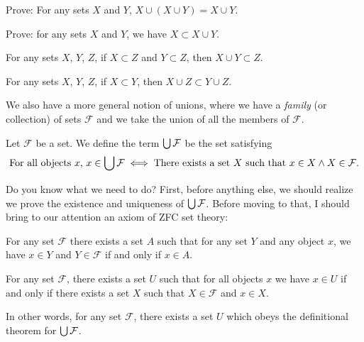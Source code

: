\begin{xca}
Prove: For any sets $X$ and $Y$, $X\cup(X\cup Y)=X\cup Y$.
\end{xca}

\begin{xca}
Prove: for any sets $X$ and $Y$, we have $X\subset X\cup Y$.
\end{xca}

\begin{xca}
For any sets $X$, $Y$, $Z$, if $X\subset Z$ and $Y\subset Z$, then
$X\cup Y\subset Z$.
\end{xca}

\begin{xca}
For any sets $X$, $Y$, $Z$, if $X\subset Y$, then
$X\cup Z\subset Y\cup Z$.
\end{xca}

We also have a more general notion of unions, where we have a
\emph{family} (or collection) of sets $\mathcal{F}$ and we take the
union of all the members of $\mathcal{F}$.

\begin{definition}
Let $\mathcal{F}$ be a set.
We define the term $\bigcup\mathcal{F}$ be the set satisfying
\begin{equation}\label{eq:def:unions:union-of-family}
\mbox{For all objects $x$, }x\in\bigcup\mathcal{F}\iff\mbox{There exists a set $X$ such that }x\in X\land X\in\mathcal{F}.
\end{equation}
\end{definition}

Do you know what we need to do? First, before anything else, we should
realize we prove the existence and uniqueness of
$\bigcup\mathcal{F}$. Before moving to that, I should bring to our
attention an axiom of ZFC set theory:

\begin{axiom}[Union]\label{axiom:existence-of-union}
For any set $\mathcal{F}$ there exists a set $A$ such that for any set
$Y$ and any object $x$, we have $x\in Y$ and $Y\in\mathcal{F}$ if and
only if $x\in A$.
\end{axiom}

\begin{theorem}[Existence]
For any set $\mathcal{F}$, there exists a set $U$ such that for all
objects $x$ we have $x\in U$ if and only if there exists a set $X$ such
that $X\in\mathcal{F}$ and $x\in X$.

In other words, for any set $\mathcal{F}$, there exists a set $U$ which
obeys the definitional theorem for $\bigcup\mathcal{F}$.
\end{theorem}

